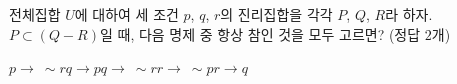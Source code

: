 전체집합 $U$에 대하여 세 조건 $p$, $q$, $r$의 진리집합을 각각 $P$, $Q$, $R$라 하자. $P\subset(Q-R)$일 때, 다음 명제 중 항상 참인 것을 모두 고르면? (정답 $2$개)
\begin{choices32}{$p\longrightarrow\ \sim r$}{$q\longrightarrow p$}{$q\longrightarrow\ \sim r$}{$r\longrightarrow\ \sim p$}{$r\longrightarrow q$}\end{choices32}
